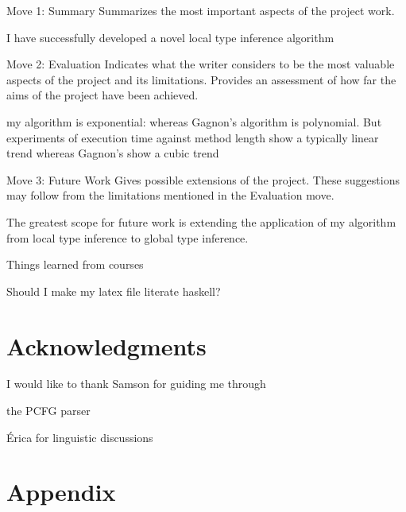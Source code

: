 \documentclass[12pt]{article}
\let\stdsection\section
\renewcommand\section{\newpage\stdsection}
\begin{document}
Move 1: Summary 
Summarizes the most important aspects of the project work.  

I have successfully developed a novel local type inference algorithm

Move 2: Evaluation
Indicates what the writer considers to be the most valuable aspects of the project and its limitations. Provides 
an assessment of how far the aims of the project have been achieved.

my algorithm is exponential: whereas Gagnon's algorithm is 
polynomial. But experiments of execution time against method length show a typically linear trend whereas 
Gagnon's show a cubic trend

Move 3: Future Work
Gives possible extensions of the project. These suggestions may follow from the limitations mentioned in the 
Evaluation move. 

The greatest scope for future work is extending the application of my algorithm from local type inference to 
global type inference.

Things learned from courses


Should I make my latex file literate haskell? %


\section{Acknowledgments}
I would like to thank Samson for guiding me through

the PCFG parser\cite{klein2003accurate}

Érica for linguistic discussions

\newpage
\section{Appendix}
\end{document}
